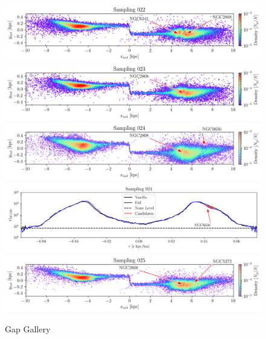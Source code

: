 \documentclass{aa}
\begin{document}
\begin{appendix}
    \begin{figure}
      \centering
      \includegraphics[width=\linewidth]{gallery_of_gaps_monte-carlo-022.png}
      \includegraphics[width=\linewidth]{gallery_of_gaps_monte-carlo-023.png}
      \includegraphics[width=\linewidth]{gallery_of_gaps_monte-carlo-024.png}   
      \includegraphics[width=\linewidth]{tau-profile-monte-carlo-024.png}
      \includegraphics[width=\linewidth]{gallery_of_gaps_monte-carlo-025.png}
      \caption{Gap Gallery}
      \label{fig:gallery5}
      \end{figure}        


\end{appendix}
\end{document}
